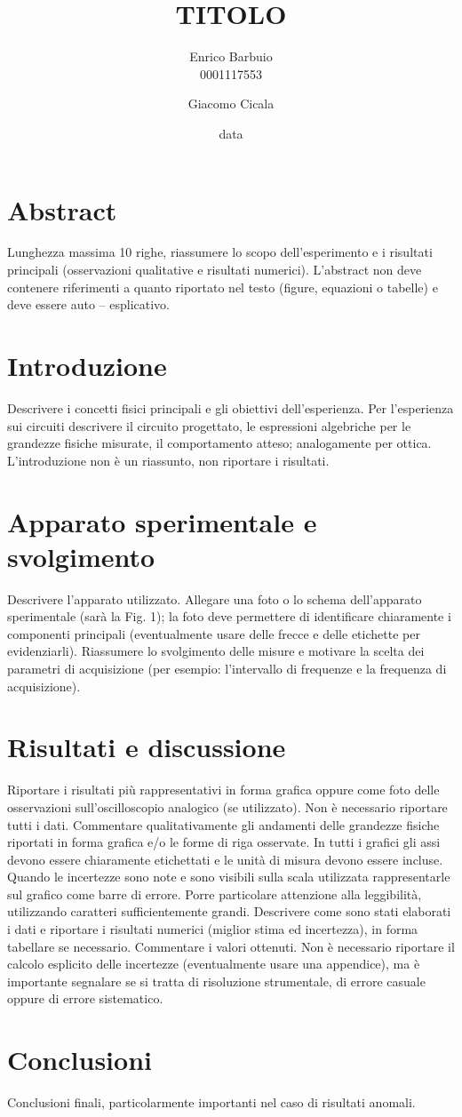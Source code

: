 \documentclass[12pt]{article}
\title{TITOLO}
\author{Enrico Barbuio \\ 0001117553 \and Giacomo Cicala}
\date{data}
\begin{document}
\maketitle  
\section*{Abstract}
Lunghezza massima 10 righe, riassumere lo scopo dell’esperimento e i risultati principali
(osservazioni qualitative e risultati numerici). L’abstract non deve contenere riferimenti a quanto
riportato nel testo (figure, equazioni o tabelle) e deve essere auto – esplicativo.

\section*{Introduzione}
Descrivere i concetti fisici principali e gli obiettivi dell’esperienza. Per l’esperienza sui circuiti
descrivere il circuito progettato, le espressioni algebriche per le grandezze fisiche misurate, il
comportamento atteso; analogamente per ottica. L’introduzione non è un riassunto, non riportare
i risultati.

\section*{Apparato sperimentale e svolgimento}
Descrivere l’apparato utilizzato. Allegare una foto o lo schema dell’apparato sperimentale
(sarà la Fig. 1); la foto deve permettere di identificare chiaramente i componenti principali
(eventualmente usare delle frecce e delle etichette per evidenziarli). Riassumere lo svolgimento
delle misure e motivare la scelta dei parametri di acquisizione (per esempio: l’intervallo di frequenze
e la frequenza di acquisizione).
\section*{Risultati e discussione}
Riportare i risultati più rappresentativi in forma grafica oppure come foto delle osservazioni
sull’oscilloscopio analogico (se utilizzato). Non è necessario riportare tutti i dati. Commentare
qualitativamente gli andamenti delle grandezze fisiche riportati in forma grafica e/o le forme di riga
osservate. In tutti i grafici gli assi devono essere chiaramente etichettati e le unità di misura devono
essere incluse. Quando le incertezze sono note e sono visibili sulla scala utilizzata rappresentarle sul
grafico come barre di errore. Porre particolare attenzione alla leggibilità, utilizzando caratteri
sufficientemente grandi.
Descrivere come sono stati elaborati i dati e riportare i risultati numerici (miglior stima ed
incertezza), in forma tabellare se necessario. Commentare i valori ottenuti. Non è necessario
riportare il calcolo esplicito delle incertezze (eventualmente usare una appendice), ma è importante
segnalare se si tratta di risoluzione strumentale, di errore casuale oppure di errore sistematico.
\section*{Conclusioni}
Conclusioni finali, particolarmente importanti nel caso di risultati anomali.
\end{document}

